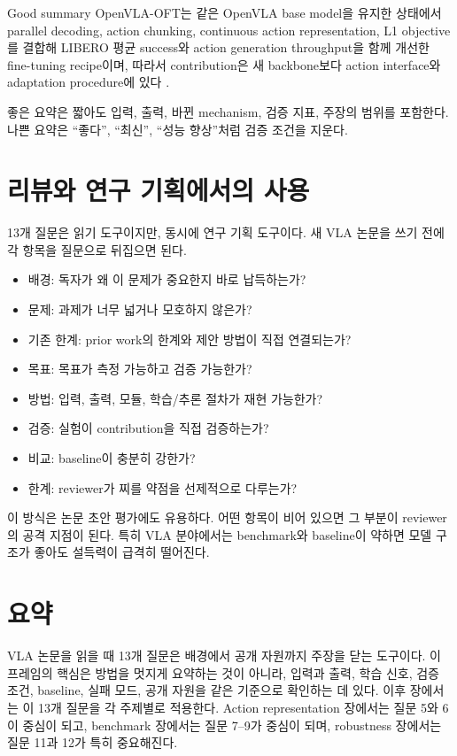 \begin{sourcebox}{Good summary}
OpenVLA-OFT는 같은 OpenVLA base model을 유지한 상태에서 parallel decoding, action chunking, continuous action representation, L1 objective를 결합해 LIBERO 평균 success와 action generation throughput을 함께 개선한 fine-tuning recipe이며, 따라서 contribution은 새 backbone보다 action interface와 adaptation procedure에 있다 \citep{openvlaoft}.
\end{sourcebox}

좋은 요약은 짧아도 입력, 출력, 바뀐 mechanism, 검증 지표, 주장의 범위를 포함한다. 나쁜 요약은 ``좋다'', ``최신'', ``성능 향상''처럼 검증 조건을 지운다.

\section{리뷰와 연구 기획에서의 사용}

13개 질문은 읽기 도구이지만, 동시에 연구 기획 도구이다. 새 VLA 논문을 쓰기 전에 각 항목을 질문으로 뒤집으면 된다.

\begin{itemize}
  \item 배경: 독자가 왜 이 문제가 중요한지 바로 납득하는가?
  \item 문제: 과제가 너무 넓거나 모호하지 않은가?
  \item 기존 한계: prior work의 한계와 제안 방법이 직접 연결되는가?
  \item 목표: 목표가 측정 가능하고 검증 가능한가?
  \item 방법: 입력, 출력, 모듈, 학습/추론 절차가 재현 가능한가?
  \item 검증: 실험이 contribution을 직접 검증하는가?
  \item 비교: baseline이 충분히 강한가?
  \item 한계: reviewer가 찌를 약점을 선제적으로 다루는가?
\end{itemize}

이 방식은 논문 초안 평가에도 유용하다. 어떤 항목이 비어 있으면 그 부분이 reviewer의 공격 지점이 된다. 특히 VLA 분야에서는 benchmark와 baseline이 약하면 모델 구조가 좋아도 설득력이 급격히 떨어진다.

\section{요약}

VLA 논문을 읽을 때 13개 질문은 배경에서 공개 자원까지 주장을 닫는 도구이다. 이 프레임의 핵심은 방법을 멋지게 요약하는 것이 아니라, 입력과 출력, 학습 신호, 검증 조건, baseline, 실패 모드, 공개 자원을 같은 기준으로 확인하는 데 있다. 이후 장에서는 이 13개 질문을 각 주제별로 적용한다. Action representation 장에서는 질문 5와 6이 중심이 되고, benchmark 장에서는 질문 7--9가 중심이 되며, robustness 장에서는 질문 11과 12가 특히 중요해진다.

